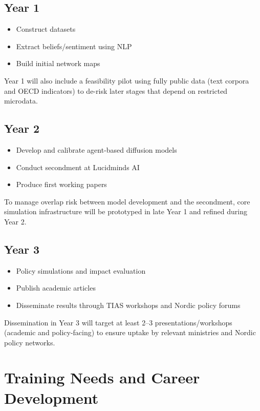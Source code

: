 \documentclass{nfr}
\begin{document}
\subsection{Year 1}

\begin{itemize}
\item Construct datasets
\item Extract beliefs/sentiment using NLP
\item Build initial network maps
\end{itemize}

Year 1 will also include a feasibility pilot using fully public data (text corpora and OECD indicators) to de-risk later stages that depend on restricted microdata.

\subsection{Year 2}

\begin{itemize}
\item Develop and calibrate agent-based diffusion models
\item Conduct secondment at Lucidminds AI
\item Produce first working papers
\end{itemize}

To manage overlap risk between model development and the secondment, core simulation infrastructure will be prototyped in late Year 1 and refined during Year 2.

\subsection{Year 3}

\begin{itemize}
\item Policy simulations and impact evaluation
\item Publish academic articles
\item Disseminate results through TIAS workshops and Nordic policy forums
\end{itemize}

Dissemination in Year 3 will target at least 2--3 presentations/workshops (academic and policy-facing) to ensure uptake by relevant ministries and Nordic policy networks.

\section{Training Needs and Career Development}
\end{document}
